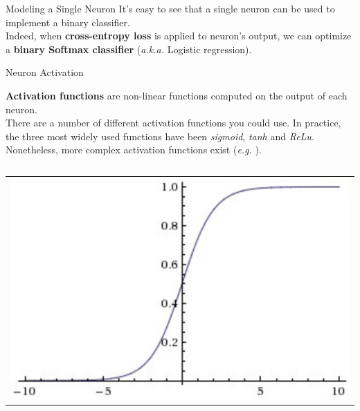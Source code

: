 \documentclass[aspectratio=169]{beamer}
\begin{document}

\begin{frame}{Modeling a Single Neuron}
It's easy to see that a single neuron can be used to implement a binary classifier.\\
\vspace{1cm}
Indeed, when \textbf{cross-entropy loss} is applied to neuron's output, we can optimize a \textbf{binary Softmax classifier} (\emph{a.k.a.} Logistic regression).
\end{frame}


\begin{frame}{Neuron Activation}

\textbf{Activation functions} are non-linear functions computed on the output of each neuron.\\
There are a number of different activation functions you could use. In practice, the three most widely used functions have been \textit{sigmoid}, \textit{tanh} and \textit{ReLu}. Nonetheless, more complex activation functions exist (\emph{e.g.} \cite{he2015delving,goodfellow2013maxout}).\\
\vspace{0.8cm}
\begin{columns}
\begin{column}{0.25\textwidth}
\begin{tabular}{c}
\\
\includegraphics[width=\textwidth]{img/cnn/act_sigmoid.jpg}\\
\end{tabular}
\end{column}

\end{columns}
\end{frame}
\end{document}
